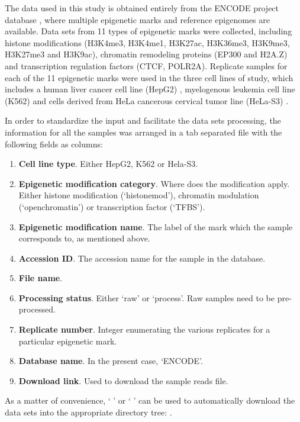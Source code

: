 The data used in this study is obtained entirely from the ENCODE project database \cite{Feingold2004}, where multiple epigenetic marks and reference epigenomes are available. Data sets from 11 types of epigenetic marks were collected, including histone modifications (H3K4me3, H3K4me1, H3K27ac, H3K36me3, H3K9me3, H3K27me3 and H3K9ac), chromatin remodeling proteins (EP300 and H2A.Z) and transcription regulation factors (CTCF, POLR2A). Replicate samples for each of the 11 epigenetic marks were used in the three cell lines of study, which includes a human liver cancer cell line (HepG2) \cite{Aden1979}, myelogenous leukemia cell line (K562) \cite{Andersson1979} and cells derived from HeLa cancerous cervical tumor line (HeLa-S3) \cite{Douglas1973,Chen2008}.

\medskip

In order to standardize the input and facilitate the data sets processing, the information for all the samples was arranged in a tab separated file with the following fields as columns:

\begin{enumerate}
    \item \textbf{Cell line type}. Either HepG2, K562 or Hela-S3.
    \item \textbf{Epigenetic modification category}. Where does the modification apply. Either histone modification (`histonemod'), chromatin modulation (`openchromatin') or transcription factor (`TFBS').
    \item \textbf{Epigenetic modification name}. The label of the mark which the sample corresponds to, as mentioned above.
    \item \textbf{Accession ID}. The accession name for the sample in the database.
    \item \textbf{File name}.
    \item \textbf{Processing status}. Either `raw' or `process'. Raw samples need to be pre-processed.
    \item \textbf{Replicate number}. Integer enumerating the various replicates for a particular epigenetic mark.
    \item \textbf{Database name}. In the present case, `ENCODE'.
    \item \textbf{Download link}. Used to download the sample reads file.
\end{enumerate}

As a matter of convenience, ` ' or `   ' can be used to automatically download the data sets into the appropriate directory tree: .

